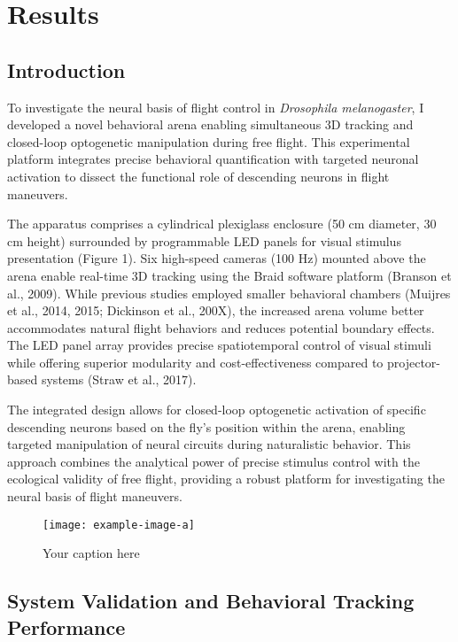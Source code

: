 \documentclass[../main/thesis_msc.tex]{subfiles}
\begin{document}
\chapter{Results}
\section{Introduction}

To investigate the neural basis of flight control in \textit{Drosophila melanogaster}, I developed a novel behavioral arena enabling simultaneous 3D tracking and closed-loop optogenetic manipulation during free flight. This experimental platform integrates precise behavioral quantification with targeted neuronal activation to dissect the functional role of descending neurons in flight maneuvers.

The apparatus comprises a cylindrical plexiglass enclosure (50 cm diameter, 30 cm height) surrounded by programmable LED panels for visual stimulus presentation (Figure 1). Six high-speed cameras (100 Hz) mounted above the arena enable real-time 3D tracking using the Braid software platform (Branson et al., 2009). While previous studies employed smaller behavioral chambers (Muijres et al., 2014, 2015; Dickinson et al., 200X), the increased arena volume better accommodates natural flight behaviors and reduces potential boundary effects. The LED panel array provides precise spatiotemporal control of visual stimuli while offering superior modularity and cost-effectiveness compared to projector-based systems (Straw et al., 2017).

The integrated design allows for closed-loop optogenetic activation of specific descending neurons based on the fly's position within the arena, enabling targeted manipulation of neural circuits during naturalistic behavior. This approach combines the analytical power of precise stimulus control with the ecological validity of free flight, providing a robust platform for investigating the neural basis of flight maneuvers.

\begin{figure}[htbp]
    \centering
    \texttt{[image: example-image-a]}
    \caption{Your caption here}
    \label{fig:your-label}
\end{figure}

\section{System Validation and Behavioral Tracking Performance}
\end{document}
